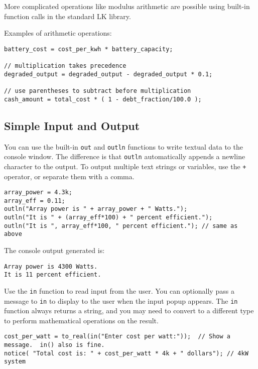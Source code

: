 \documentclass{article}
\begin{document}
More complicated operations like modulus arithmetic are possible using built-in function calls in the standard LK library.

Examples of arithmetic operations:
\begin{verbatim}
battery_cost = cost_per_kwh * battery_capacity;

// multiplication takes precedence
degraded_output = degraded_output - degraded_output * 0.1;

// use parentheses to subtract before multiplication
cash_amount = total_cost * ( 1 - debt_fraction/100.0 );

\end{verbatim}

\subsection{Simple Input and Output}

You can use the built-in \texttt{out} and \texttt{outln} functions to write textual data to the console window. The difference is that \texttt{outln} automatically appends a newline character to the output. To output multiple text strings or variables, use the \texttt{+} operator, or separate them with a comma.

\begin{verbatim}
array_power = 4.3k;
array_eff = 0.11;
outln("Array power is " + array_power + " Watts.");
outln("It is " + (array_eff*100) + " percent efficient.");
outln("It is ", array_eff*100, " percent efficient."); // same as above
\end{verbatim}

The console output generated is:
\begin{verbatim}
Array power is 4300 Watts.
It is 11 percent efficient.
\end{verbatim}

Use the \texttt{in} function to read input from the user.  You can optionally pass a message to \texttt{in} to display to the user when the input popup appears. The \texttt{in} function always returns a string, and you may need to convert to a different type to perform mathematical operations on the result.

\begin{verbatim}
cost_per_watt = to_real(in("Enter cost per watt:"));  // Show a message.  in() also is fine.
notice( "Total cost is: " + cost_per_watt * 4k + " dollars"); // 4kW system
\end{verbatim}
\end{document}
